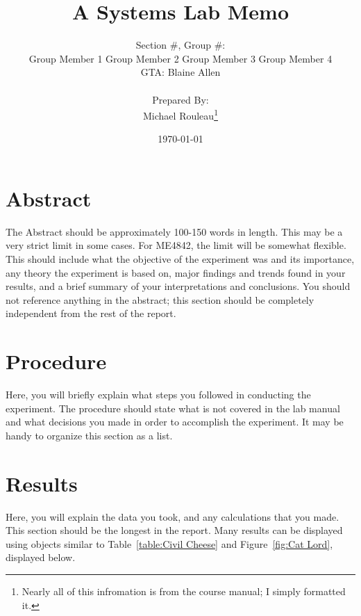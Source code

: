 \documentclass[11pt,a4paper]{article}
\title{\Huge A Systems Lab Memo}
\author{Section \#, Group \#: \\
  Group Member 1 \quad Group Member 2 \quad Group Member 3 \quad Group Member 4 \\ GTA: Blaine Allen \\\\ Prepared By: \\ Michael Rouleau\thanks{Nearly all of this infromation is from the course manual\cite{Stutts}; I simply formatted it.}}
\date{\today}
\begin{document}
\null  %
\nointerlineskip  %
\vfill
\let\snewpage \newpage
\let\newpage \relax
\maketitle
\let \newpage \snewpage
\vfill 
\break %

\section*{Abstract}
The Abstract should be approximately 100-150 words in length. This may be a very strict limit in some cases. For ME4842, the limit will be somewhat flexible. This should include what the objective of the experiment was and its importance, any theory the experiment is based on, major findings and trends found in your results, and a brief summary of your interpretations and conclusions. You should not reference anything in the abstract; this section should be completely independent from the rest of the report.

\section*{Procedure}
Here, you will briefly explain what steps you followed in conducting the experiment. The procedure should state what is not covered in the lab manual and what decisions you made in order to accomplish the experiment. It may be handy to organize this section as a list.

\section*{Results}
Here, you will explain the data you took, and any calculations that you made. This section should be the longest in the report. Many results can be displayed using objects similar to  Table~\ref{table:Civil Cheese} and Figure~\ref{fig:Cat Lord}, displayed below.

\end{document}

